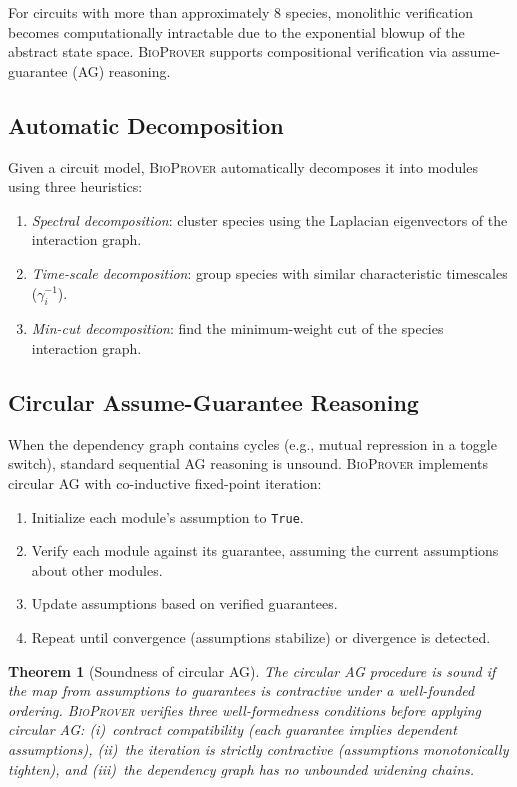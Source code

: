 \documentclass[11pt]{article}
\newtheorem{theorem}{Theorem}
\newcommand{\bioprover}{\textsc{BioProver}}
\begin{document}
For circuits with more than approximately 8 species, monolithic
verification becomes computationally intractable due to the
exponential blowup of the abstract state space. \bioprover{} supports
compositional verification via assume-guarantee (AG) reasoning.

\subsection{Automatic Decomposition}

Given a circuit model, \bioprover{} automatically decomposes it into
modules using three heuristics:
\begin{enumerate}[itemsep=1pt]
\item \emph{Spectral decomposition}: cluster species using the
  Laplacian eigenvectors of the interaction graph.
\item \emph{Time-scale decomposition}: group species with similar
  characteristic timescales ($\gamma_i^{-1}$).
\item \emph{Min-cut decomposition}: find the minimum-weight cut of
  the species interaction graph.
\end{enumerate}

\subsection{Circular Assume-Guarantee Reasoning}

When the dependency graph contains cycles (e.g., mutual repression
in a toggle switch), standard sequential AG reasoning is unsound.
\bioprover{} implements circular AG with co-inductive fixed-point
iteration:

\begin{enumerate}[itemsep=1pt]
\item Initialize each module's assumption to \texttt{True}.
\item Verify each module against its guarantee, assuming the current
  assumptions about other modules.
\item Update assumptions based on verified guarantees.
\item Repeat until convergence (assumptions stabilize) or divergence
  is detected.
\end{enumerate}

\begin{theorem}[Soundness of circular AG]
\label{thm:ag}
The circular AG procedure is sound if the map from assumptions to
guarantees is contractive under a well-founded ordering. \bioprover{}
verifies three well-formedness conditions before applying circular AG:
(i)~contract compatibility (each guarantee implies dependent
assumptions), (ii)~the iteration is strictly contractive (assumptions
monotonically tighten), and (iii)~the dependency graph has no
unbounded widening chains.
\end{theorem}
\end{document}
